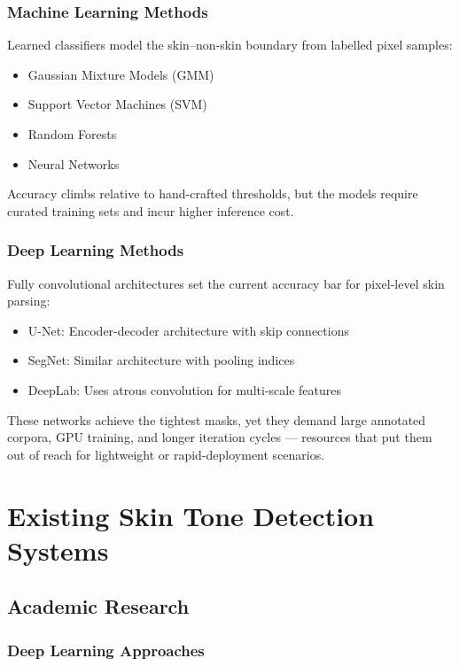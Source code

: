 \subsubsection{Machine Learning Methods}

Learned classifiers model the skin–non-skin boundary from labelled pixel samples:

\begin{itemize}
    \item Gaussian Mixture Models (GMM)
    \item Support Vector Machines (SVM)
    \item Random Forests
    \item Neural Networks
\end{itemize}

Accuracy climbs relative to hand-crafted thresholds, but the models require curated training sets and incur higher inference cost.

\subsubsection{Deep Learning Methods}

Fully convolutional architectures set the current accuracy bar for pixel-level skin parsing:

\begin{itemize}
    \item U-Net: Encoder-decoder architecture with skip connections
    \item SegNet: Similar architecture with pooling indices
    \item DeepLab: Uses atrous convolution for multi-scale features
\end{itemize}

These networks achieve the tightest masks, yet they demand large annotated corpora, GPU training, and longer iteration cycles — resources that put them out of reach for lightweight or rapid-deployment scenarios.

\section{Existing Skin Tone Detection Systems}

\subsection{Academic Research}

\subsubsection{Deep Learning Approaches}


